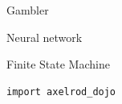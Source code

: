 \documentclass{beamer}
\newcommand{\mlresearchfolder}{$HOME/rsc/ml-paper}
\begin{document}
    \begin{frame}
        \begin{center}
            \Large Gambler

            \vfill
            \normalsize

            \scalebox{.8}{
                
            }
        \end{center}
    \end{frame}

    \begin{frame}
        \begin{center}
            \Large Neural network

            \vfill
            \normalsize

            \scalebox{.7}{
                
            }
        \end{center}
    \end{frame}

    \begin{frame}
        \begin{center}
            \Large Finite State Machine

            \vfill
            \normalsize

            \scalebox{.7}{
                
            }
        \end{center}
    \end{frame}


\begin{frame}[fragile]{}

    \begin{center}
        \begin{minipage}{0.8\textwidth}
            \begin{verbatim}
import axelrod_dojo
            \end{verbatim}
        \end{minipage}
    \end{center}

\end{frame}
\end{document}
